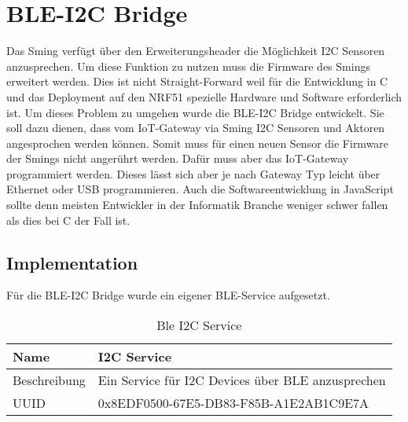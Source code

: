 \chapter{BLE-I2C Bridge}
\label{bleI2cBridge}

Das Sming verfügt über den Erweiterungsheader die Möglichkeit I2C Sensoren anzusprechen. Um diese Funktion zu nutzen muss die Firmware des Smings erweitert werden. Dies ist nicht Straight-Forward weil für die Entwicklung in C und das Deployment auf den NRF51 spezielle Hardware und Software erforderlich ist. Um dieses Problem zu umgehen wurde die BLE-I2C Bridge entwickelt. Sie soll dazu dienen, dass vom IoT-Gateway via Sming I2C Sensoren und Aktoren angesprochen werden können. Somit muss für einen neuen Sensor die Firmware der Smings nicht angerührt werden. Dafür muss aber das IoT-Gateway programmiert werden. Dieses lässt sich aber je nach Gateway Typ leicht über Ethernet oder USB programmieren. Auch die Softwareentwicklung in JavaScript sollte denn meisten Entwickler in der Informatik Branche weniger schwer fallen als dies bei C der Fall ist.

\section{Implementation}
\label{bleI2cImplementation}

Für die BLE-I2C Bridge wurde ein eigener BLE-Service aufgesetzt.

\begin{table}[h]
\centering
\begin{tabularx}{\textwidth}{|l|X|}
\hline
Name & I2C Service                                       \\
\hline
Beschreibung & Ein Service für I2C Devices über BLE anzusprechen \\
\hline
UUID	&    0x8EDF0500-67E5-DB83-F85B-A1E2AB1C9E7A  \\
\hline                                            
\end{tabularx}
\caption{Ble I2C Service}
\label{tab:bleI3cService}
\end{table}